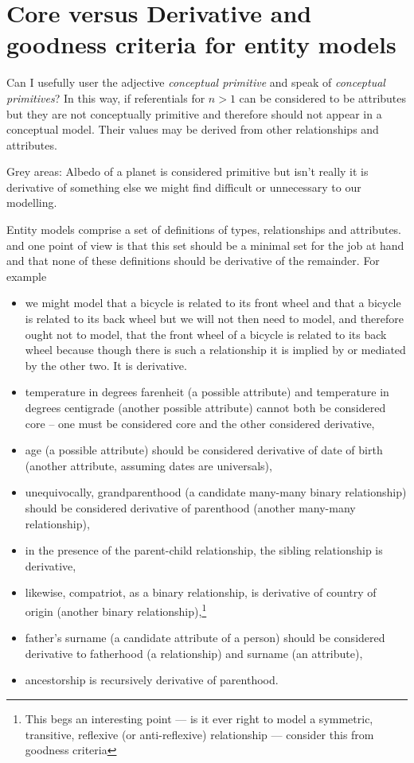 
\section{Core versus Derivative \small and goodness criteria for entity models}
\label{CoreversusDerivative}
\mynote Can I usefully user the adjective \textit{conceptual primitive}
and speak of \textit{conceptual primitives}?
\mynote In this way, if referentials for $n > 1$ can be considered to be attributes but they are not conceptually primitive and therefore should not appear in a conceptual model. Their values may be derived from other relationships and attributes. 

\mynote Grey areas: Albedo of a planet is considered primitive but isn't really it is derivative of something else we might find difficult or unnecessary to our modelling. 

\mynote Entity models comprise a set of definitions of types, relationships and attributes. 
and one point of view is that this set should be a minimal set for the job at hand and that none of these definitions should be derivative of the remainder. For example
\begin{itemize}
\item we might model that a bicycle is related to its front wheel and that a bicycle is related to its back wheel but we will not then need to model,  and therefore ought not to model, that the front wheel of a bicycle is related to its back wheel because though there is such a relationship it is implied by or mediated by the other two. It is derivative.
\item temperature in degrees farenheit (a possible attribute) and temperature in degrees centigrade (another possible attribute) cannot both be considered core -- one must be considered core and the other considered derivative,
\item age (a possible attribute) should be considered derivative of date of birth (another attribute, assuming dates are universals),
\item unequivocally, grandparenthood (a candidate many-many binary relationship) should be considered derivative of parenthood (another many-many relationship),
\item in  the presence of the parent-child relationship, the sibling relationship
is derivative,
\item likewise, compatriot, as a binary relationship, is derivative of country of origin (another binary relationship),\footnote{This begs an interesting point --- is it ever right to model a symmetric, transitive, reflexive (or anti-reflexive) relationship --- consider this from goodness criteria}
\item father's surname (a candidate attribute of a person)  should be considered derivative to fatherhood (a relationship) and surname (an attribute), 
\item ancestorship is recursively derivative of parenthood. 
\end{itemize}


